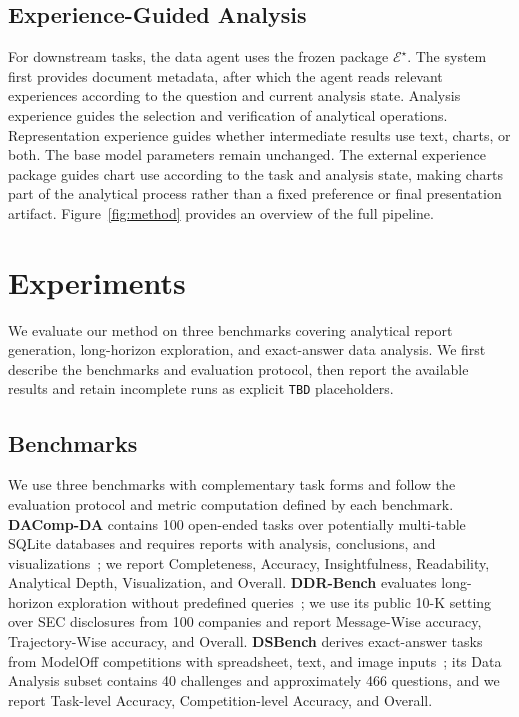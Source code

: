 \documentclass{article}
\begin{document}
\subsection{Experience-Guided Analysis}
\label{sec:online}

For downstream tasks, the data agent uses the frozen package $\mathcal{E}^{\star}$.
The system first provides document metadata, after which the agent reads relevant experiences according to the question and current analysis state.
Analysis experience guides the selection and verification of analytical operations.
Representation experience guides whether intermediate results use text, charts, or both.
The base model parameters remain unchanged.
The external experience package guides chart use according to the task and analysis state, making charts part of the analytical process rather than a fixed preference or final presentation artifact.
Figure~\ref{fig:method} provides an overview of the full pipeline.

\section{Experiments}
\label{sec:experiments}

We evaluate our method on three benchmarks covering analytical report generation, long-horizon exploration, and exact-answer data analysis.
We first describe the benchmarks and evaluation protocol, then report the available results and retain incomplete runs as explicit \texttt{TBD} placeholders.

\subsection{Benchmarks}
\label{sec:benchmarks}

We use three benchmarks with complementary task forms and follow the evaluation protocol and metric computation defined by each benchmark.
\textbf{DAComp-DA} contains 100 open-ended tasks over potentially multi-table SQLite databases and requires reports with analysis, conclusions, and visualizations~\citep{lei2025dacomp}; we report Completeness, Accuracy, Insightfulness, Readability, Analytical Depth, Visualization, and Overall.
\textbf{DDR-Bench} evaluates long-horizon exploration without predefined queries~\citep{liu2026ddrbench}; we use its public 10-K setting over SEC disclosures from 100 companies and report Message-Wise accuracy, Trajectory-Wise accuracy, and Overall.
\textbf{DSBench} derives exact-answer tasks from ModelOff competitions with spreadsheet, text, and image inputs~\citep{jing2024dsbench}; its Data Analysis subset contains 40 challenges and approximately 466 questions, and we report Task-level Accuracy, Competition-level Accuracy, and Overall.
\end{document}
